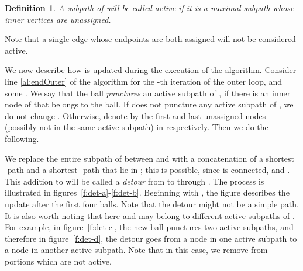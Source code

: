 \documentclass[twoside,leqno,twocolumn]{article}
\newtheorem{definition}[Definition]{Definition}
\newtheorem{definition}[theorem]{Definition}
\begin{document}
\begin{definition}
A subpath of  will be called {\em active} if it is a maximal subpath whose inner vertices are unassigned.
\end{definition}

Note that a single edge whose endpoints are both assigned will not be considered active.

We now describe how  is updated during the execution of the algorithm. Consider line \ref{al:endOuter} of the algorithm for the -th iteration of the outer loop, and some . We say that the ball  {\em punctures} an active subpath  of , if there is an inner node of  that belongs to the ball.
If  does not puncture any active subpath of , we do not change . Otherwise, denote by  the first and last unassigned nodes (possibly not in the same active subpath) in  respectively. Then we do the following.

We replace the entire subpath of  between  and  with a concatenation of a shortest -path and a shortest -path that lie in ; this is possible, since  is connected, and .
This addition to  will be called a {\em detour} from  to  through . The process is illustrated in figures~\ref{f:det-a}-\ref{f:det-b}. Beginning with , the figure describes the update after the first four balls. Note that the detour might not be a simple path.
It is also worth noting that here  and  may belong to different active subpaths of . For example, in figure~\ref{f:det-c}, the new ball punctures two active subpaths, and therefore in figure~\ref{f:det-d}, the detour goes from a node in one active subpath to a node in another active subpath. Note that in this case, we remove from  portions which are not active.
\end{document}
